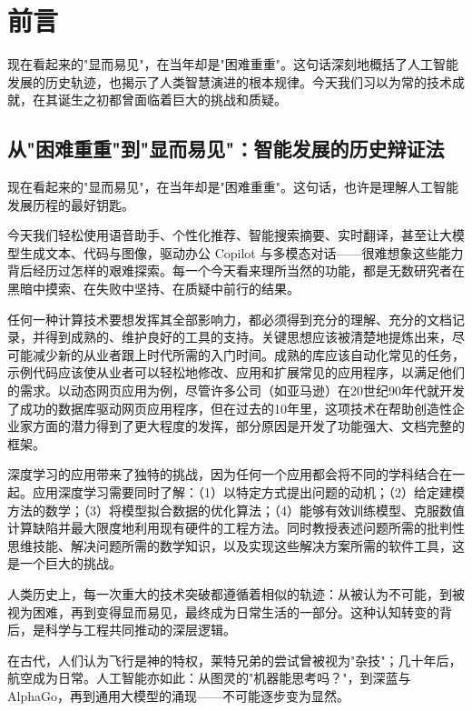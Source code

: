 \chapter*{前言}
\begin{introduction}
\item 现在看起来的"显而易见"，在当年却是"困难重重"。这句话深刻地概括了人工智能发展的历史轨迹，也揭示了人类智慧演进的根本规律。今天我们习以为常的技术成就，在其诞生之初都曾面临着巨大的挑战和质疑。
\end{introduction}

\section{从"困难重重"到"显而易见"：智能发展的历史辩证法}

现在看起来的"显而易见"，在当年却是"困难重重"。这句话，也许是理解人工智能发展历程的最好钥匙。

今天我们轻松使用语音助手、个性化推荐、智能搜索摘要、实时翻译，甚至让大模型生成文本、代码与图像，驱动办公 Copilot 与多模态对话——很难想象这些能力背后经历过怎样的艰难探索。每一个今天看来理所当然的功能，都是无数研究者在黑暗中摸索、在失败中坚持、在质疑中前行的结果。

任何一种计算技术要想发挥其全部影响力，都必须得到充分的理解、充分的文档记录，并得到成熟的、维护良好的工具的支持。关键思想应该被清楚地提炼出来，尽可能减少新的从业者跟上时代所需的入门时间。成熟的库应该自动化常见的任务，示例代码应该使从业者可以轻松地修改、应用和扩展常见的应用程序，以满足他们的需求。以动态网页应用为例，尽管许多公司（如亚马逊）在20世纪90年代就开发了成功的数据库驱动网页应用程序，但在过去的10年里，这项技术在帮助创造性企业家方面的潜力得到了更大程度的发挥，部分原因是开发了功能强大、文档完整的框架。

深度学习的应用带来了独特的挑战，因为任何一个应用都会将不同的学科结合在一起。应用深度学习需要同时了解：（1）以特定方式提出问题的动机；（2）给定建模方法的数学；（3）将模型拟合数据的优化算法；（4）能够有效训练模型、克服数值计算缺陷并最大限度地利用现有硬件的工程方法。同时教授表述问题所需的批判性思维技能、解决问题所需的数学知识，以及实现这些解决方案所需的软件工具，这是一个巨大的挑战。

人类历史上，每一次重大的技术突破都遵循着相似的轨迹：从被认为不可能，到被视为困难，再到变得显而易见，最终成为日常生活的一部分。这种认知转变的背后，是科学与工程共同推动的深层逻辑。

在古代，人们认为飞行是神的特权，莱特兄弟的尝试曾被视为"杂技"；几十年后，航空成为日常。人工智能亦如此：从图灵的"机器能思考吗？"，到深蓝与AlphaGo，再到通用大模型的涌现——不可能逐步变为显然。

